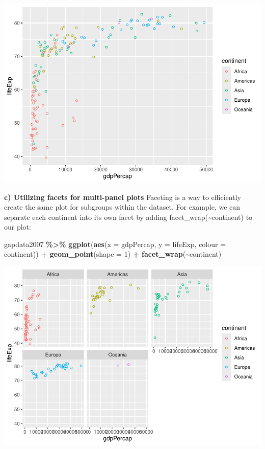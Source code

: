 \documentclass[
]{book}
\newenvironment{Shaded}{\begin{snugshade}}{\end{snugshade}}
\newcommand{\AttributeTok}[1]{\textcolor[rgb]{0.13,0.29,0.53}{#1}}
\newcommand{\DecValTok}[1]{\textcolor[rgb]{0.00,0.00,0.81}{#1}}
\newcommand{\FunctionTok}[1]{\textcolor[rgb]{0.13,0.29,0.53}{\textbf{#1}}}
\newcommand{\NormalTok}[1]{#1}
\newcommand{\SpecialCharTok}[1]{\textcolor[rgb]{0.81,0.36,0.00}{\textbf{#1}}}
\begin{document}
\includegraphics{_main_files/figure-latex/unnamed-chunk-82-1.pdf}

\textbf{c) Utilizing facets for multi-panel plots}
Faceting is a way to efficiently create the same plot for subgroups within the dataset. For example, we can separate each continent into its own facet by adding facet\_wrap(\textasciitilde continent) to our plot:

\begin{Shaded}
\begin{Highlighting}[]
\NormalTok{gapdata2007 }\SpecialCharTok{\%\textgreater{}\%}
\FunctionTok{ggplot}\NormalTok{(}\FunctionTok{aes}\NormalTok{(}\AttributeTok{x =}\NormalTok{ gdpPercap, }\AttributeTok{y =}\NormalTok{ lifeExp, }\AttributeTok{colour =}\NormalTok{ continent)) }\SpecialCharTok{+}
\FunctionTok{geom\_point}\NormalTok{(}\AttributeTok{shape =} \DecValTok{1}\NormalTok{) }\SpecialCharTok{+}
\FunctionTok{facet\_wrap}\NormalTok{(}\SpecialCharTok{\textasciitilde{}}\NormalTok{continent)}
\end{Highlighting}
\end{Shaded}

\includegraphics{_main_files/figure-latex/unnamed-chunk-83-1.pdf}
\end{document}
